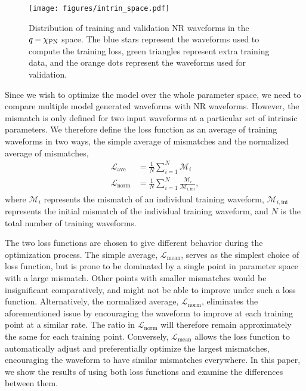 \documentclass[twocolumn]{aastex631}
\begin{document}
\begin{figure}[t]
	\centering
	\texttt{[image: figures/intrin\_space.pdf]}
	\caption{Distribution of training and validation NR waveforms in the
	$q-\chi_{\rm PN}$ space. The blue stars represent the waveforms used to compute
	the training loss, green triangles represent extra training data, and the 
	orange dots represent the waveforms used for validation.}
	\label{fig:intrin_space}
\end{figure}

Since we wish to optimize the model over the whole parameter space,
we need to compare multiple model generated waveforms with NR waveforms.
However, the mismatch is only defined for two input waveforms at a particular set of intrinsic parameters.
We therefore define the loss function as an average of training waveforms in two ways,
the simple average of mismatches and the normalized average of mismatches,  
\begin{align}\label{eqn:loss}
	\mathcal{L}_{\mathrm{ave}}&=\frac{1}{N}\sum_{i=1}^N\mathcal{M}_i \\
	\mathcal{L}_{\mathrm{norm}}&=\frac{1}{N}\sum_{i=1}^N\frac{\mathcal{M}_i}{\mathcal{M}_{i,\mathrm{ini}}},
\end{align}	
where $\mathcal{M}_i$ represents the mismatch of an individual training waveform,
$\mathcal{M}_{i,\mathrm{ini}}$ represents the initial mismatch of the individual
training waveform, and $N$ is the total number of training waveforms.

The two loss functions are chosen to give different 
behavior during the optimization process.
The simple average, $\mathcal{L}_{\mathrm{mean}}$, serves as the simplest choice of loss function,
but is prone to be dominated by a single point in parameter space with a large mismatch.
Other points with smaller mismatches would be insignificant comparatively, and might not be able 
to improve under such a loss function.
Alternatively, the normalized average, $\mathcal{L}_{\mathrm{norm}}$, eliminates the aforementioned issue
by encouraging the waveform to improve at each training point at a similar rate.
The ratio in $\mathcal{L}_{\mathrm{norm}}$ will therefore remain approximately the same for each training point.
Conversely, $\mathcal{L}_{\mathrm{mean}}$ allows the loss function to automatically adjust
and preferentially optimize the largest mismatches, encouraging the waveform to have similar mismatches everywhere.
In this paper, we show the results of using both loss functions 
and examine the differences between them. 
\end{document}
